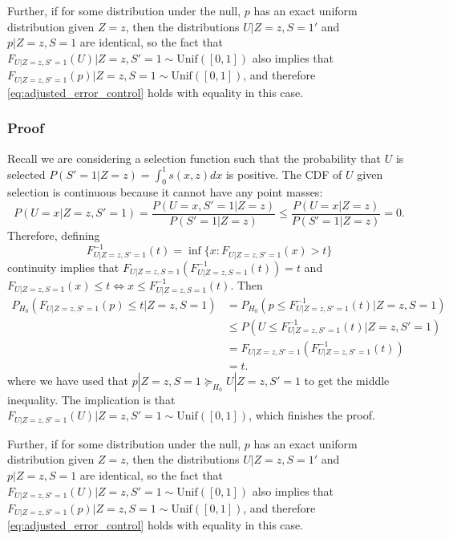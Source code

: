 \documentclass{article}
\begin{document}
\begin{appendix}
Further, if for some distribution under the null, $p$ has an exact uniform distribution given $Z=z$, then the distributions $U | Z = z, S= 1'$ and $p | Z= z , S=1$ are identical, so the fact that $F_{U|Z=z, S' = 1}(U) |Z=z, S' = 1 \sim \text{Unif}([0, 1])$ also implies that $F_{U|Z=z, S' = 1}(p) |Z=z, S = 1 \sim \text{Unif}([0, 1])$, and therefore \eqref{eq:adjusted_error_control} holds with equality in this case. 

\subsubsection{Proof}
Recall we are considering a selection function such that the probability that $U$ is selected $P(S'=1 | Z= z) = \int_0^1 s(x, z) dx$ is positive. The CDF of $U$ given selection is continuous because it cannot have any point masses:
\begin{equation*}
    P(U = x | Z=z, S' = 1) = \frac{P(U = x, S' = 1| Z=z)}{P(S'=1 |Z=z)} \leq \frac{P(U = x|Z=z)}{P(S'=1|Z=z)} =  0. 
\end{equation*}
Therefore, defining 
\begin{equation*}
    F^{-1}_{U |Z=z, S'=1}(t)  = \inf \{x: F_{U |Z=z, S' = 1}(x) > t  \}
\end{equation*}
continuity implies that $F_{U|Z=z, S =1}(F^{-1}_{U |Z=z, S=1}(t)) = t$ and $F_{U | Z=z, S = 1}(x) \leq t \iff x \leq  F^{-1}_{U | Z=z, S = 1}(t)$. Then 
\begin{align*}
    P_{H_0}(F_{U | Z=z, S' = 1}(p) \leq  t |Z=z, S=1) &= P_{H_0}(p \leq F_{U |Z=z,  S' = 1}^{-1}(t) | Z=z, S=1) \\
    &\leq P(U \leq F_{U |Z=z, S' = 1}^{-1}(t) |Z=z, S'=1) \\
    &=F_{U|Z=z, S'=1}(F_{U|Z=z, S' = 1}^{-1}(t)) \\
    &=t. 
\end{align*}
where we have used that $p | Z=z, S=1 \succeq_{H_0} U |Z=z, S'=1$ to get the middle inequality. The implication is that $F_{U|Z=z, S' = 1}(U) |Z=z, S' = 1 \sim \text{Unif}([0, 1])$, which finishes the proof. 

Further, if for some distribution under the null, $p$ has an exact uniform distribution given $Z=z$, then the distributions $U | Z = z, S= 1'$ and $p | Z= z , S=1$ are identical, so the fact that $F_{U|Z=z, S' = 1}(U) |Z=z, S' = 1 \sim \text{Unif}([0, 1])$ also implies that $F_{U|Z=z, S' = 1}(p) |Z=z, S = 1 \sim \text{Unif}([0, 1])$, and therefore \eqref{eq:adjusted_error_control} holds with equality in this case. 



\end{appendix}
\end{document}
